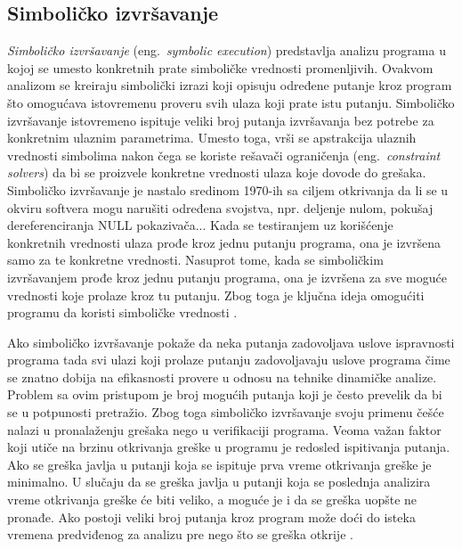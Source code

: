 \documentclass[12pt,oneside]{memoir}
\begin{document}
\subsection{Simboličko izvršavanje}
\textit{Simboličko izvršavanje} (eng.~\textit{symbolic execution}) predstavlja analizu programa u kojoj se umesto konkretnih prate simboličke vrednosti promenljivih. Ovakvom analizom se kreiraju simbolički izrazi koji opisuju određene putanje kroz program što omogućava istovremenu proveru svih ulaza koji prate istu putanju. Simboličko izvršavanje istovremeno ispituje veliki broj putanja izvršavanja bez potrebe za konkretnim ulaznim parametrima. Umesto toga, vrši se apstrakcija ulaznih vrednosti simbolima nakon čega se koriste rešavači ograničenja (eng.~\textit{constraint solvers}) da bi se proizvele konkretne vrednosti ulaza koje dovode do grešaka. Simboličko izvršavanje je nastalo sredinom 1970-ih sa ciljem otkrivanja da li se u okviru softvera mogu narušiti određena svojstva, npr. deljenje nulom, pokušaj dereferenciranja NULL pokazivača... Kada se testiranjem uz korišćenje konkretnih vrednosti ulaza prođe kroz jednu putanju programa, ona je izvršena samo za te konkretne vrednosti. Nasuprot tome, kada se simboličkim izvršavanjem prođe kroz jednu putanju programa, ona je izvršena za sve moguće vrednosti koje prolaze kroz tu putanju. Zbog toga je ključna ideja omogućiti programu da koristi simboličke vrednosti \cite{mvj, SurveySymExec}. 

Ako simboličko izvršavanje pokaže da neka putanja zadovoljava uslove ispravnosti programa tada svi ulazi koji prolaze putanju zadovoljavaju uslove programa čime se znatno dobija na efikasnosti provere u odnosu na tehnike dinamičke analize. Problem sa ovim pristupom je broj mogućih putanja koji je često prevelik da bi se u potpunosti pretražio. Zbog toga simboličko izvršavanje svoju primenu češće nalazi  u pronalaženju grešaka nego u verifikaciji programa. Veoma važan faktor koji utiče na brzinu otkrivanja greške u programu je redosled ispitivanja putanja. Ako se greška javlja u putanji koja se ispituje prva vreme otkrivanja greške je minimalno. U slučaju da se greška javlja u putanji koja se poslednja analizira vreme otkrivanja greške će biti veliko, a moguće je i da se greška uopšte ne pronađe. Ako postoji veliki broj putanja kroz program može doći do isteka vremena predviđenog za analizu pre nego što se greška otkrije \cite{mvj}.
\end{document}
